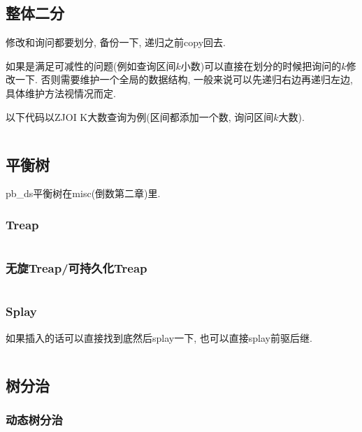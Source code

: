 \documentclass[a4paper, twoside]{article}
\begin{document}
\begin{multicols}{2}
			\subsection{整体二分}
				修改和询问都要划分, 备份一下, 递归之前copy回去.

				如果是满足可减性的问题(例如查询区间$k$小数)可以直接在划分的时候把询问的$k$修改一下. 否则需要维护一个全局的数据结构, 一般来说可以先递归右边再递归左边, 具体维护方法视情况而定.

				以下代码以ZJOI K大数查询为例(区间都添加一个数, 询问区间$k$大数).

				\inputminted{cpp}{../src/datastructure/整体二分.cpp}

	
	
			\subsection{平衡树}
				pb\_ds平衡树在misc(倒数第二章)里.

				\subsubsection{Treap}
					\inputminted{cpp}{../src/datastructure/Treap.cpp}
					
				\subsubsection{无旋Treap/可持久化Treap}
					\inputminted{cpp}{../src/datastructure/无旋Treap.cpp}
		
		
				\subsubsection{Splay}
					如果插入的话可以直接找到底然后splay一下, 也可以直接splay前驱后继.
					\inputminted{cpp}{../src/datastructure/文艺平衡树.cpp}
				
				
			\subsection{树分治}

				
				\subsubsection{动态树分治}
					\inputminted{cpp}{../src/datastructure/动态树分治.cpp}


\end{multicols}
\end{document}
